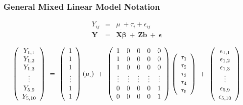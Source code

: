 \documentclass[serif]{beamer} %
\begin{document}
\begin{frame}
\frametitle{General Mixed Linear Model Notation}
\begin{eqnarray*}
     Y_{ij} & = &\mu_. + \tau_i + \epsilon_{ij} \\
     \mathbf{Y} & = & \mathbf{X} \boldsymbol{\beta} ~+~ \mathbf{Zb} ~+~\boldsymbol{\epsilon}
\end{eqnarray*} 

\begin{displaymath}
\left( \begin{array}{c}
Y_{1,1} \\ Y_{1,2} \\ Y_{1,3} \\ \vdots \\ Y_{5,9} \\ Y_{5,10}
\end{array} \right) ~=~
\left( \begin{array}{c}
1 \\ 1 \\ 1 \\ \vdots \\ 1 \\ 1
\end{array} \right) (\mu_.) ~+~
     \left( \begin{array}{c c c c c}
                 1 & 0 & 0 & 0 & 0 \\
                 1 & 0 & 0 & 0 & 0 \\
                 1 & 0 & 0 & 0 & 0 \\
  \vdots &    \vdots &    \vdots &    \vdots &    \vdots \\
                 0 & 0 & 0 & 0 & 1 \\
                 0 & 0 & 0 & 0 & 1 \\
    \end{array} \right)
 \left( \begin{array}{c}
\tau_1 \\ \tau_2 \\ \tau_3 \\\tau_4 \\ \tau_5
\end{array} \right) ~+~
\left( \begin{array}{c}
\epsilon_{1,1} \\ \epsilon_{1,2} \\ \epsilon_{1,3} \\ \vdots \\ \epsilon_{5,9} \\ \epsilon_{5,10}
\end{array} \right)
\end{displaymath}

\end{frame}
\end{document}
